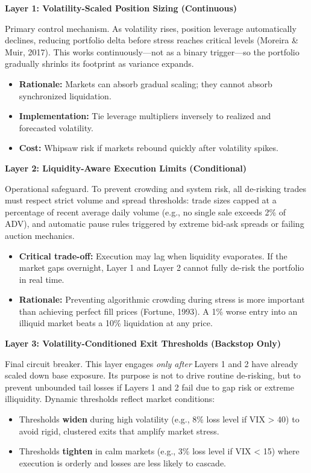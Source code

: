 \documentclass[12pt, a4paper]{article}
\begin{document}
\noindent\textbf{Layer 1: Volatility-Scaled Position Sizing (Continuous)}

Primary control mechanism. As volatility rises, position leverage automatically declines, reducing
portfolio delta before stress reaches critical levels (Moreira \& Muir, 2017). This works continuously---not
as a binary trigger---so the portfolio gradually shrinks its footprint as variance expands.

\begin{itemize}[leftmargin=1.5em, itemsep=3pt, topsep=3pt]
  \item \textbf{Rationale:} Markets can absorb gradual scaling; they cannot absorb synchronized liquidation.
  \item \textbf{Implementation:} Tie leverage multipliers inversely to realized and forecasted volatility.
  \item \textbf{Cost:} Whipsaw risk if markets rebound quickly after volatility spikes.
\end{itemize}

\noindent\textbf{Layer 2: Liquidity-Aware Execution Limits (Conditional)}

Operational safeguard. To prevent crowding and system risk, all de-risking trades must respect
strict volume and spread thresholds: trade sizes capped at a percentage of recent average daily volume
(e.g., no single sale exceeds 2\% of ADV), and automatic pause rules triggered by extreme bid-ask
spreads or failing auction mechanics.

\begin{itemize}[leftmargin=1.5em, itemsep=3pt, topsep=3pt]
  \item \textbf{Critical trade-off:} Execution may lag when liquidity evaporates. If the market gaps overnight,
    Layer 1 and Layer 2 cannot fully de-risk the portfolio in real time.
  \item \textbf{Rationale:} Preventing algorithmic crowding during stress is more important than achieving
    perfect fill prices (Fortune, 1993). A 1\% worse entry into an illiquid market beats a 10\% liquidation at any price.
\end{itemize}

\noindent\textbf{Layer 3: Volatility-Conditioned Exit Thresholds (Backstop Only)}

Final circuit breaker. This layer engages \textit{only after} Layers 1 and 2 have already scaled down
base exposure. Its purpose is not to drive routine de-risking, but to prevent unbounded tail losses
if Layers 1 and 2 fail due to gap risk or extreme illiquidity. Dynamic thresholds reflect market conditions:
\begin{itemize}[leftmargin=1.5em, itemsep=3pt, topsep=3pt]
  \item Thresholds \textbf{widen} during high volatility (e.g., 8\% loss level if VIX > 40) to avoid rigid, clustered
    exits that amplify market stress.
  \item Thresholds \textbf{tighten} in calm markets (e.g., 3\% loss level if VIX < 15) where execution is orderly
    and losses are less likely to cascade.
\end{itemize}
\end{document}
